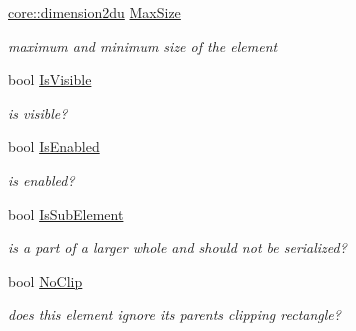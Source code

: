\begin{DoxyCompactItemize}
\mbox{\label{classirr_1_1gui_1_1IGUIElement_a1649a1c740c333bfb026397411c4da95}} 
\hyperlink{namespaceirr_1_1core_a13e5bd7e47b2014eefc870ede11bbbbc}{core\+::dimension2du} \hyperlink{classirr_1_1gui_1_1IGUIElement_a1649a1c740c333bfb026397411c4da95}{Max\+Size}
\begin{DoxyCompactList}\small\item\em maximum and minimum size of the element \end{DoxyCompactList}\item 
\mbox{\label{classirr_1_1gui_1_1IGUIElement_ad8dd8fdfb5be3e4cca1f1603cbcfaccf}} 
bool \hyperlink{classirr_1_1gui_1_1IGUIElement_ad8dd8fdfb5be3e4cca1f1603cbcfaccf}{Is\+Visible}
\begin{DoxyCompactList}\small\item\em is visible? \end{DoxyCompactList}\item 
\mbox{\label{classirr_1_1gui_1_1IGUIElement_aba90d3c36184d3b6d62a8856a8734590}} 
bool \hyperlink{classirr_1_1gui_1_1IGUIElement_aba90d3c36184d3b6d62a8856a8734590}{Is\+Enabled}
\begin{DoxyCompactList}\small\item\em is enabled? \end{DoxyCompactList}\item 
\mbox{\label{classirr_1_1gui_1_1IGUIElement_a19f65c7004c5b36c848dad776aabc151}} 
bool \hyperlink{classirr_1_1gui_1_1IGUIElement_a19f65c7004c5b36c848dad776aabc151}{Is\+Sub\+Element}
\begin{DoxyCompactList}\small\item\em is a part of a larger whole and should not be serialized? \end{DoxyCompactList}\item 
\mbox{\label{classirr_1_1gui_1_1IGUIElement_a8f9ad427fe094e0e8c49cf205c606526}} 
bool \hyperlink{classirr_1_1gui_1_1IGUIElement_a8f9ad427fe094e0e8c49cf205c606526}{No\+Clip}
\begin{DoxyCompactList}\small\item\em does this element ignore its parent\textquotesingle{}s clipping rectangle? \end{DoxyCompactList}\item 

\end{DoxyCompactItemize}
